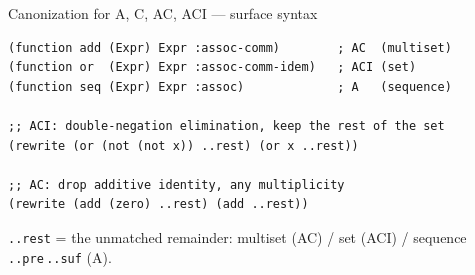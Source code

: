 \documentclass[aspectratio=169,10pt]{beamer}
\newcommand{\code}[1]{\texttt{\small #1}}
\begin{document}

\begin{frame}[fragile]{Canonization for A, C, AC, ACI --- surface syntax}
\begin{lstlisting}[basicstyle=\ttfamily\normalsize]
(function add (Expr) Expr :assoc-comm)        ; AC  (multiset)
(function or  (Expr) Expr :assoc-comm-idem)   ; ACI (set)
(function seq (Expr) Expr :assoc)             ; A   (sequence)

;; ACI: double-negation elimination, keep the rest of the set
(rewrite (or (not (not x)) ..rest) (or x ..rest))

;; AC: drop additive identity, any multiplicity
(rewrite (add (zero) ..rest) (add ..rest))
\end{lstlisting}
\medskip
\small \code{..rest} = the unmatched remainder:
\alert{multiset} (AC) / \alert{set} (ACI) / \alert{sequence} \code{..pre}\,\code{..suf} (A).
\end{frame}
\end{document}
